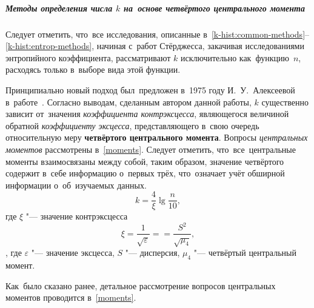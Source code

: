 \documentclass[]{scrartcl}
\begin{document}
\subparagraph{Методы определения числа $k$ на~основе четвёртого центрального момента}
\par

Следует отметить, что~все исследования, описанные в~\ref*{k-hist:common-methods}--\ref{k-hist:entrop-methods}, начиная с~работ Стёрджесса, закачивая исследованиями энтропийного коэффициента, рассматривают $k$ исключительно как~функцию~$n$, расходясь только в~выборе вида этой функции.

Принципиально новый подход был~предложен в~1975 году И.~У.~Алексеевой в~работе~\cite{Alekseewa:k-hist}. Согласно выводам, сделанным автором данной работы, $k$ существенно зависит от~значения \emph{коэффициента контрэксцесса}, являющегося величиной обратной \emph{коэффициенту эксцесса}, представляющего в~свою очередь относительную меру \textbf{четвёртого центрального момента}. Вопросы \emph{центральных моментов} рассмотрены в~\ref{moments}. Следует отметить, что~все~центральные моменты взаимосвязаны между собой, таким образом, значение четвёртого содержит в~себе информацию о~первых трёх, что~означает учёт обширной информации о~об~изучаемых данных.
\begin{equation}\label{eq:hist_Alekseewa-0}
k = \frac{4}{\xi}\lg\frac{n}{10},
\end{equation}
где $\xi$ "--- значение контрэксцесса
\begin{equation}\label{eq:kontr-kurtosis}
\xi = \frac{1}{\sqrt{\varepsilon}} == \frac{S^2}{\sqrt{\mu_4}},
\end{equation},
где $\varepsilon$ "--- значение эксцесса,
$S$ "--- дисперсия,
$\mu_4$ "--- четвёртый центральный момент.

Как~было сказано ранее, детальное рассмотрение вопросов центральных моментов проводится в~\ref{moments}.
\end{document}
